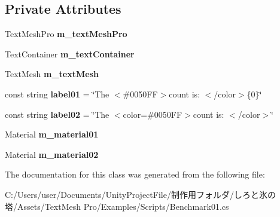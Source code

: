 \subsection*{Private Attributes}
\begin{DoxyCompactItemize}
\item 
\mbox{\label{class_t_m_pro_1_1_examples_1_1_benchmark01_aeffa4ceaf4dc78bbe7ea5edb00ade157}} 
Text\+Mesh\+Pro {\bfseries m\+\_\+text\+Mesh\+Pro}
\item 
\mbox{\label{class_t_m_pro_1_1_examples_1_1_benchmark01_a8e52e91b8d83663ccef6e11f6f9cee38}} 
Text\+Container {\bfseries m\+\_\+text\+Container}
\item 
\mbox{\label{class_t_m_pro_1_1_examples_1_1_benchmark01_a1fc13c5132d5561cbacf7854754a14a7}} 
Text\+Mesh {\bfseries m\+\_\+text\+Mesh}
\item 
\mbox{\label{class_t_m_pro_1_1_examples_1_1_benchmark01_a77be73d3b7e00ba36cf8996a0f4ecf3a}} 
const string {\bfseries label01} = \char`\"{}The $<$\#0050\+F\+F$>$count is\+: $<$/color$>$\{0\}\char`\"{}
\item 
\mbox{\label{class_t_m_pro_1_1_examples_1_1_benchmark01_ad592c85a36ff01c147af5953b647e721}} 
const string {\bfseries label02} = \char`\"{}The $<$color=\#0050\+F\+F$>$count is\+: $<$/color$>$\char`\"{}
\item 
\mbox{\label{class_t_m_pro_1_1_examples_1_1_benchmark01_a2c178228c97f2aa9e5f8e48a62c85810}} 
Material {\bfseries m\+\_\+material01}
\item 
\mbox{\label{class_t_m_pro_1_1_examples_1_1_benchmark01_a0dc7f445e129a625644c411430b4be40}} 
Material {\bfseries m\+\_\+material02}
\end{DoxyCompactItemize}


The documentation for this class was generated from the following file\+:\begin{DoxyCompactItemize}
\item 
C\+:/\+Users/user/\+Documents/\+Unity\+Project\+File/制作用フォルダ/しろと氷の塔/\+Assets/\+Text\+Mesh Pro/\+Examples/\+Scripts/Benchmark01.\+cs\end{DoxyCompactItemize}
